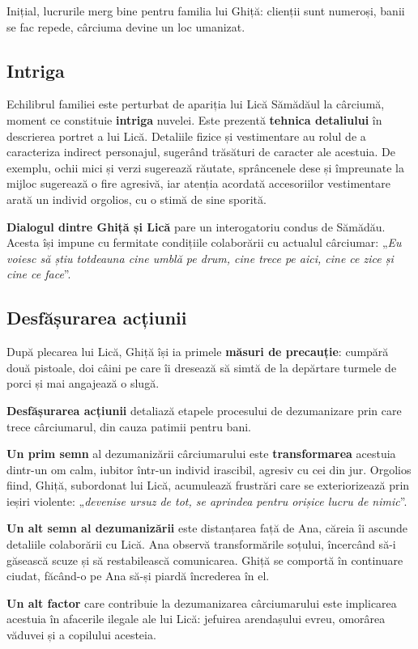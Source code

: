 \documentclass{article}
\newcommand{\qu}[1]{„\emph{#1}”}
\begin{document}
Inițial, lucrurile merg bine pentru familia lui Ghiță: clienții sunt numeroși, banii se fac repede, cârciuma devine un loc umanizat.

\subsection{Intriga}
Echilibrul familiei este perturbat de apariția lui Lică Sămădăul la cârciumă, moment ce constituie \textbf{intriga} nuvelei. Este prezentă \textbf{tehnica detaliului} în descrierea portret a lui Lică. Detaliile fizice și vestimentare au rolul de a caracteriza indirect personajul, sugerând trăsături de caracter ale acestuia. De exemplu, ochii mici și verzi sugerează răutate, sprâncenele dese și împreunate la mijloc sugerează o fire agresivă, iar atenția acordată accesoriilor vestimentare arată un individ orgolios, cu o stimă de sine sporită.

\textbf{Dialogul dintre Ghiță și Lică} pare un interogatoriu condus de Sămădău. Acesta își impune cu fermitate condițiile colaborării cu actualul cârciumar: \qu{Eu voiesc să știu totdeauna cine umblă pe drum, cine trece pe aici, cine ce zice și cine ce face}.

\subsection{Desfășurarea acțiunii}
După plecarea lui Lică, Ghiță își ia primele \textbf{măsuri de precauție}: cumpără două pistoale, doi câini pe care îi dresează să simtă de la depărtare turmele de porci și mai angajează o slugă.

\textbf{Desfășurarea acțiunii} detaliază etapele procesului de dezumanizare prin care trece cârciumarul, din cauza patimii pentru bani.

\textbf{Un prim semn} al dezumanizării cârciumarului este \textbf{transformarea} acestuia dintr-un om calm, iubitor într-un individ irascibil, agresiv cu cei din jur. Orgolios fiind, Ghiță, subordonat lui Lică, acumulează frustrări care se exteriorizează prin ieșiri violente: \qu{devenise ursuz de tot, se aprindea pentru orișice lucru de nimic}.

\textbf{Un alt semn al dezumanizării} este distanțarea față de Ana, căreia îi ascunde detaliile colaborării cu Lică. Ana observă transformările soțului, încercând să-i găsească scuze și să restabilească comunicarea. Ghiță se comportă în continuare ciudat, făcând-o pe Ana să-și piardă încrederea în el.

\textbf{Un alt factor} care contribuie la dezumanizarea cârciumarului este implicarea acestuia în afacerile ilegale ale lui Lică: jefuirea arendașului evreu, omorârea văduvei și a copilului acesteia.
\end{document}
